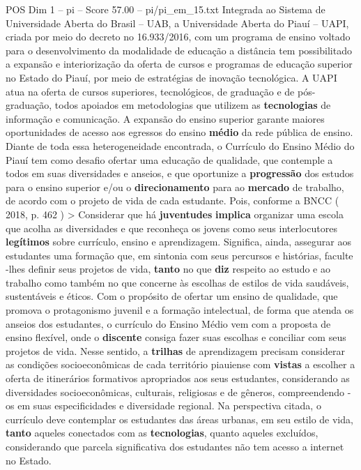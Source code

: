 \begin{textsample}{POS Dim 1 – pi – Score 57.00 – pi/pi\_em\_15.txt}
Integrada ao Sistema de Universidade Aberta do Brasil – UAB, a Universidade Aberta do Piauí – UAPI, criada por meio do decreto no 16.933/2016, com um programa de ensino voltado para o desenvolvimento da modalidade de educação a distância tem possibilitado a expansão e interiorização da oferta de cursos e programas de educação superior no Estado do Piauí, por meio de estratégias de inovação tecnológica.
A UAPI atua na oferta de cursos superiores, tecnológicos, de graduação e de pós-graduação, todos apoiados em metodologias que utilizem as \textbf{tecnologias} de informação e comunicação.
A expansão do ensino superior garante maiores oportunidades de acesso aos egressos do ensino \textbf{médio} da rede pública de ensino.
Diante de toda essa heterogeneidade encontrada, o Currículo do Ensino Médio do Piauí tem como desafio ofertar uma educação de qualidade, que contemple a todos em suas diversidades e anseios, e que oportunize a \textbf{progressão} dos estudos para o ensino superior e/ou o \textbf{direcionamento} para ao \textbf{mercado} de trabalho, de acordo com o projeto de vida de cada estudante.
Pois, conforme a BNCC ( 2018, p. 462 ) > Considerar que há \textbf{juventudes} \textbf{implica} organizar uma escola que acolha as diversidades e que reconheça os jovens como seus interlocutores \textbf{legítimos} sobre currículo, ensino e aprendizagem.
Significa, ainda, assegurar aos estudantes uma formação que, em sintonia com seus percursos e histórias, faculte -lhes definir seus projetos de vida, \textbf{tanto} no que \textbf{diz} respeito ao estudo e ao trabalho como também no que concerne às escolhas de estilos de vida saudáveis, sustentáveis e éticos.
Com o propósito de ofertar um ensino de qualidade, que promova o protagonismo juvenil e a formação intelectual, de forma que atenda os anseios dos estudantes, o currículo do Ensino Médio vem com a proposta de ensino flexível, onde o \textbf{discente} consiga fazer suas escolhas e conciliar com seus projetos de vida.
Nesse sentido, a \textbf{trilhas} de aprendizagem precisam considerar as condições socioeconômicas de cada território piauiense com \textbf{vistas} a escolher a oferta de itinerários formativos apropriados aos seus estudantes, considerando as diversidades socioeconômicas, culturais, religiosas e de gêneros, compreendendo -os em suas especificidades e diversidade regional.
Na perspectiva citada, o currículo deve contemplar os estudantes das áreas urbanas, em seu estilo de vida, \textbf{tanto} aqueles conectados com as \textbf{tecnologias}, quanto aqueles excluídos, considerando que parcela significativa dos estudantes não tem acesso a internet no Estado.

\end{textsample}
